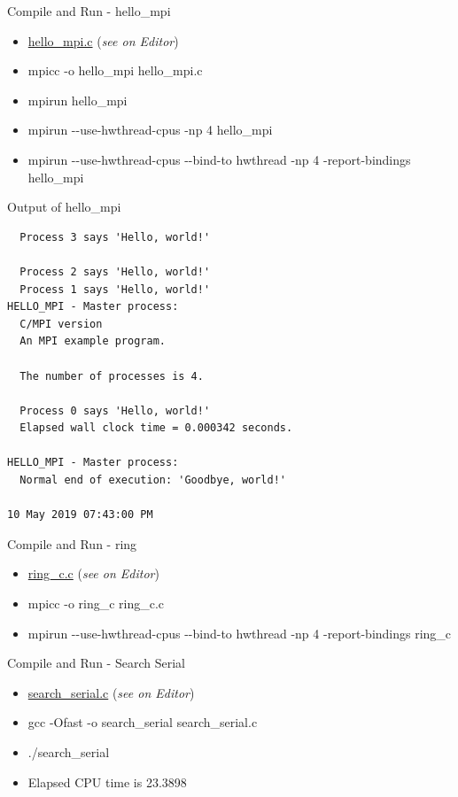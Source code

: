 \documentclass[ignorenonframetext,]{beamer}
\providecommand{\tightlist}{%
  \setlength{\itemsep}{0pt}\setlength{\parskip}{0pt}}
\begin{document}
\begin{frame}{Compile and Run - hello\_mpi}

\begin{itemize}
\item
  \href{file://hello_mpi.c}{hello\_mpi.c} (\emph{see on Editor})
\item
  mpicc -o hello\_mpi hello\_mpi.c
\item
  mpirun hello\_mpi
\item
  mpirun -\/-use-hwthread-cpus -np 4 hello\_mpi
\item
  mpirun -\/-use-hwthread-cpus -\/-bind-to hwthread -np 4
  -report-bindings hello\_mpi
\end{itemize}


\end{frame}

\begin{frame}[fragile]{Output of hello\_mpi}

\begin{verbatim}
  Process 3 says 'Hello, world!'

  Process 2 says 'Hello, world!'
  Process 1 says 'Hello, world!'
HELLO_MPI - Master process:
  C/MPI version
  An MPI example program.

  The number of processes is 4.

  Process 0 says 'Hello, world!'
  Elapsed wall clock time = 0.000342 seconds.

HELLO_MPI - Master process:
  Normal end of execution: 'Goodbye, world!'

10 May 2019 07:43:00 PM
\end{verbatim}

\end{frame}

\begin{frame}{Compile and Run - ring}

\begin{itemize}
\item
  \url{ring_c.c} (\emph{see on Editor})
\item
  mpicc -o ring\_c ring\_c.c
\item
  mpirun -\/-use-hwthread-cpus -\/-bind-to hwthread -np 4
  -report-bindings ring\_c
\end{itemize}

\end{frame}

\begin{frame}{Compile and Run - Search Serial}

\begin{itemize}
\tightlist
\item
  \url{search_serial.c} (\emph{see on Editor})
\item
  gcc -Ofast -o search\_serial search\_serial.c
\item
  ./search\_serial
\end{itemize}


\begin{itemize}
\tightlist
\item
  Elapsed CPU time is 23.3898
\end{itemize}

\end{frame}
\end{document}
